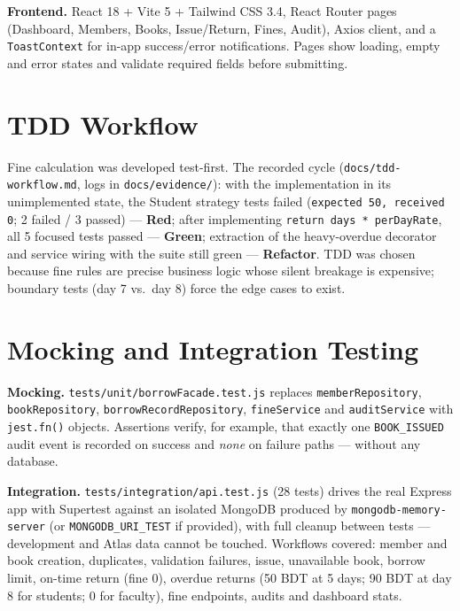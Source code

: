 \documentclass[12pt,a4paper]{article}
\begin{document}
\textbf{Frontend.} React 18 + Vite 5 + Tailwind CSS 3.4, React Router pages
(Dashboard, Members, Books, Issue/Return, Fines, Audit), Axios client, and a
\texttt{ToastContext} for in-app success/error notifications. Pages show
loading, empty and error states and validate required fields before
submitting.

\section{TDD Workflow}
Fine calculation was developed test-first. The recorded cycle
(\texttt{docs/tdd-workflow.md}, logs in \texttt{docs/evidence/}): with the
implementation in its unimplemented state, the Student strategy tests failed
(\texttt{expected 50, received 0}; 2 failed / 3 passed) — \textbf{Red};
after implementing \texttt{return days * perDayRate}, all 5 focused tests
passed — \textbf{Green}; extraction of the heavy-overdue decorator and
service wiring with the suite still green — \textbf{Refactor}. TDD was
chosen because fine rules are precise business logic whose silent breakage
is expensive; boundary tests (day 7 vs.\ day 8) force the edge cases to
exist.

\section{Mocking and Integration Testing}
\textbf{Mocking.} \texttt{tests/unit/borrowFacade.test.js} replaces
\texttt{memberRepository}, \texttt{bookRepository},
\texttt{borrowRecordRepository}, \texttt{fineService} and
\texttt{auditService} with \texttt{jest.fn()} objects. Assertions verify,
for example, that exactly one \texttt{BOOK\_ISSUED} audit event is recorded
on success and \emph{none} on failure paths — without any database.

\textbf{Integration.} \texttt{tests/integration/api.test.js} (28 tests)
drives the real Express app with Supertest against an isolated
MongoDB produced by \texttt{mongodb-memory-server} (or
\texttt{MONGODB\_URI\_TEST} if provided), with full cleanup between tests —
development and Atlas data cannot be touched. Workflows covered: member and
book creation, duplicates, validation failures, issue, unavailable book,
borrow limit, on-time return (fine 0), overdue returns (50 BDT at 5 days;
90 BDT at day 8 for students; 0 for faculty), fine endpoints, audits and
dashboard stats.
\end{document}
